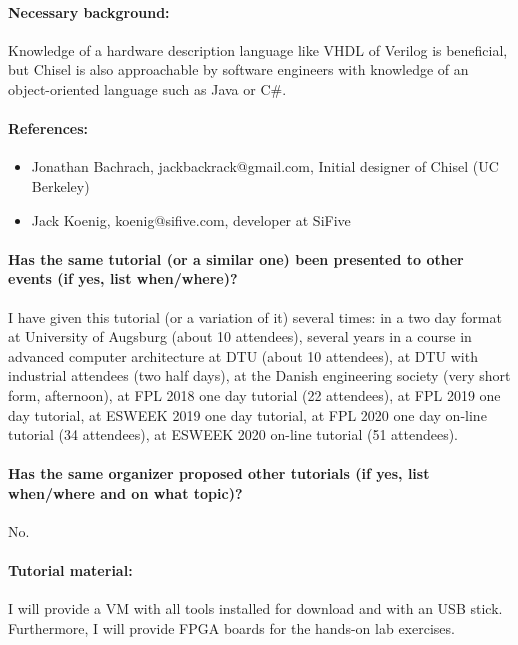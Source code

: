 \documentclass{article}
\begin{document}
 \paragraph{Necessary background:}

Knowledge of a hardware description language like VHDL of Verilog is beneficial, but Chisel is also
approachable by software engineers with knowledge of an object-oriented language such as Java or C\#.

 \paragraph{References:}

\begin{itemize}
\item Jonathan Bachrach, jackbackrack@gmail.com, Initial designer of Chisel (UC Berkeley)
\item Jack Koenig, koenig@sifive.com, developer at SiFive
\end{itemize}

\paragraph{Has the same tutorial (or a similar one) been presented to other events (if yes, list when/where)?}

I have given this tutorial (or a variation of it) several times:
in a two day format at University of Augsburg (about 10 attendees), several years
in a course in advanced computer architecture at DTU (about 10 attendees),
at DTU with industrial attendees (two half days),
at the Danish engineering society (very short form, afternoon),
at FPL 2018 one day tutorial (22 attendees), at FPL 2019 one day tutorial,
at ESWEEK 2019 one day tutorial, at FPL 2020 one day on-line tutorial (34 attendees),
at ESWEEK 2020 on-line tutorial (51 attendees).

\paragraph{Has the same organizer proposed other tutorials (if yes, list when/where and on what topic)?}

No.

 \paragraph{Tutorial material:} I will provide a VM with all tools installed for download and with an USB stick. Furthermore, I will provide FPGA boards for the hands-on lab exercises.
 
\end{document}
